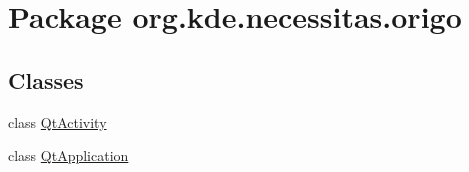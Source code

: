 \hypertarget{namespaceorg_1_1kde_1_1necessitas_1_1origo}{\section{Package org.\-kde.\-necessitas.\-origo}
\label{d7/d1b/namespaceorg_1_1kde_1_1necessitas_1_1origo}
}
\subsection*{Classes}
\begin{DoxyCompactItemize}
\item 
class \hyperlink{classorg_1_1kde_1_1necessitas_1_1origo_1_1_qt_activity}{Qt\-Activity}
\item 
class \hyperlink{classorg_1_1kde_1_1necessitas_1_1origo_1_1_qt_application}{Qt\-Application}
\end{DoxyCompactItemize}
